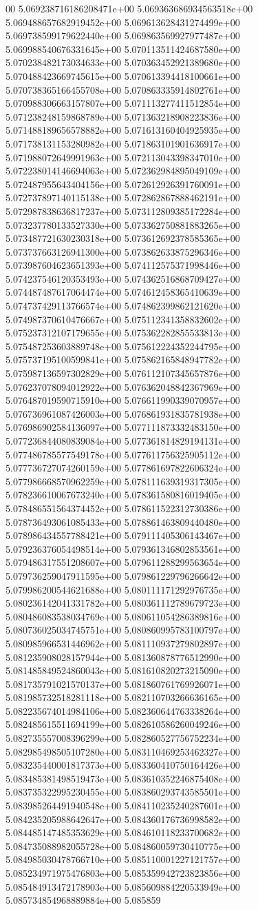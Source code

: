 00	5.069238716186208471e+00	5.069363686934563518e+00	5.069488657682919452e+00	5.069613628431274499e+00	5.069738599179622440e+00	5.069863569927977487e+00	5.069988540676331645e+00	5.070113511424687580e+00	5.070238482173034633e+00	5.070363452921389680e+00	5.070488423669745615e+00	5.070613394418100661e+00	5.070738365166455708e+00	5.070863335914802761e+00	5.070988306663157807e+00	5.071113277411512854e+00	5.071238248159868789e+00	5.071363218908223836e+00	5.071488189656578882e+00	5.071613160404925935e+00	5.071738131153280982e+00	5.071863101901636917e+00	5.071988072649991963e+00	5.072113043398347010e+00	5.072238014146694063e+00	5.072362984895049109e+00	5.072487955643404156e+00	5.072612926391760091e+00	5.072737897140115138e+00	5.072862867888462191e+00	5.072987838636817237e+00	5.073112809385172284e+00	5.073237780133527330e+00	5.073362750881883265e+00	5.073487721630230318e+00	5.073612692378585365e+00	5.073737663126941300e+00	5.073862633875296346e+00	5.073987604623651393e+00	5.074112575371998446e+00	5.074237546120353493e+00	5.074362516868709427e+00	5.074487487617064474e+00	5.074612458365410639e+00	5.074737429113766574e+00	5.074862399862121620e+00	5.074987370610476667e+00	5.075112341358832602e+00	5.075237312107179655e+00	5.075362282855533813e+00	5.075487253603889748e+00	5.075612224352244795e+00	5.075737195100599841e+00	5.075862165848947782e+00	5.075987136597302829e+00	5.076112107345657876e+00	5.076237078094012922e+00	5.076362048842367969e+00	5.076487019590715910e+00	5.076611990339070957e+00	5.076736961087426003e+00	5.076861931835781938e+00	5.076986902584136097e+00	5.077111873332483150e+00	5.077236844080839084e+00	5.077361814829194131e+00	5.077486785577549178e+00	5.077611756325905112e+00	5.077736727074260159e+00	5.077861697822606324e+00	5.077986668570962259e+00	5.078111639319317305e+00	5.078236610067673240e+00	5.078361580816019405e+00	5.078486551564374452e+00	5.078611522312730386e+00	5.078736493061085433e+00	5.078861463809440480e+00	5.078986434557788421e+00	5.079111405306143467e+00	5.079236376054498514e+00	5.079361346802853561e+00	5.079486317551208607e+00	5.079611288299563654e+00	5.079736259047911595e+00	5.079861229796266642e+00	5.079986200544621688e+00	5.080111171292976735e+00	5.080236142041331782e+00	5.080361112789679723e+00	5.080486083538034769e+00	5.080611054286389816e+00	5.080736025034745751e+00	5.080860995783100797e+00	5.080985966531446962e+00	5.081110937279802897e+00	5.081235908028157944e+00	5.081360878776512990e+00	5.081485849524860043e+00	5.081610820273215090e+00	5.081735791021570137e+00	5.081860761769926071e+00	5.081985732518281118e+00	5.082110703266636165e+00	5.082235674014984106e+00	5.082360644763338264e+00	5.082485615511694199e+00	5.082610586260049246e+00	5.082735557008396299e+00	5.082860527756752234e+00	5.082985498505107280e+00	5.083110469253462327e+00	5.083235440001817373e+00	5.083360410750164426e+00	5.083485381498519473e+00	5.083610352246875408e+00	5.083735322995230455e+00	5.083860293743585501e+00	5.083985264491940548e+00	5.084110235240287601e+00	5.084235205988642647e+00	5.084360176736998582e+00	5.084485147485353629e+00	5.084610118233700682e+00	5.084735088982055728e+00	5.084860059730410775e+00	5.084985030478766710e+00	5.085110001227121757e+00	5.085234971975476803e+00	5.085359942723823856e+00	5.085484913472178903e+00	5.085609884220533949e+00	5.085734854968889884e+00	5.085859